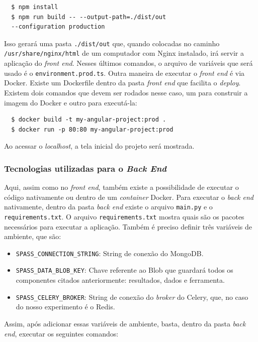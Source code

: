 \documentclass[11pt,twoside]{article}
\begin{document}
  \begin{verbatim}
  $ npm install 
  $ npm run build -- --output-path=./dist/out
  --configuration production
  \end{verbatim}


Isso gerará uma pasta \texttt{./dist/out} que, quando colocadas no caminho \texttt{/usr/share/nginx/html} de um computador com Nginx instalado, irá servir a aplicação do \emph{front end}.
Nesses últimos comandos, o arquivo de variáveis que será usado é o \texttt{environment.prod.ts}.
Outra maneira de executar o \emph{front end} é via Docker. Existe um Dockerfile dentro da pasta \emph{front end} que facilita o \emph{deploy}. Existem dois comandos que devem ser rodados nesse caso, um
para construir a imagem do Docker e outro para executá-la:

  \begin{verbatim}
  $ docker build -t my-angular-project:prod .
  $ docker run -p 80:80 my-angular-project:prod
  \end{verbatim}

Ao acessar o \emph{localhost}, a tela inicial do projeto será mostrada.

\subsubsection{Tecnologias utilizadas para o \emph{Back End}}

Aqui, assim como no \emph{front end}, também existe a possibilidade de executar o código nativamente ou dentro de um \emph{container} Docker. Para executar o \emph{back end} nativamente, dentro da pasta \emph{back end}
existe o arquivo \texttt{main.py} e o \texttt{requirements.txt}. O arquivo \texttt{requirements.txt} mostra quais são os pacotes necessários para executar a aplicação. Também é preciso definir três
variáveis de ambiente, que são:

\begin{itemize}
  \item \texttt{SPASS\_CONNECTION\_STRING}: String de conexão do MongoDB.
  \item \texttt{SPASS\_DATA\_BLOB\_KEY}: Chave referente ao Blob que guardará todos os componentes citados anteriormente: resultados, dados e ferramenta.
  \item \texttt{SPASS\_CELERY\_BROKER}: String de conexão do \emph{broker} do Celery, que, no caso do nosso experimento é o Redis.
\end{itemize}

Assim, após adicionar essas variáveis de ambiente, basta, dentro da pasta \emph{back end}, executar os seguintes comandos:
\end{document}
